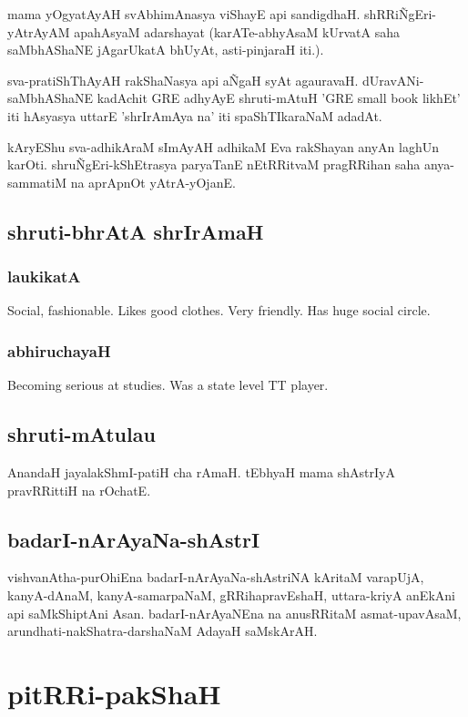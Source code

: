 \documentclass[oneside, article]{memoir}
\begin{document}
mama yOgyatAyAH svAbhimAnasya viShayE api sandigdhaH. shRRi\~NgEri-yAtrAyAM  apahAsyaM adarshayat (karATe-abhyAsaM kUrvatA saha saMbhAShaNE jAgarUkatA bhUyAt, asti-pinjaraH iti.).

sva-pratiShThAyAH rakShaNasya api a\~NgaH syAt agauravaH. dUravANi-saMbhAShaNE kadAchit GRE adhyAyE shruti-mAtuH 'GRE small book likhEt' iti hAsyasya uttarE 'shrIrAmAya na' iti spaShTIkaraNaM adadAt.

kAryEShu sva-adhikAraM sImAyAH adhikaM Eva rakShayan anyAn laghUn karOti. shru\~NgEri-kShEtrasya paryaTanE nEtRRitvaM pragRRihan saha anya-sammatiM na aprApnOt yAtrA-yOjanE.

\chapter{shruti-bhrAtA shrIrAmaH}
\section{laukikatA}
Social, fashionable. Likes good clothes. Very friendly. Has huge social circle.

\section{abhiruchayaH}
Becoming serious at studies. Was a state level TT player.

\chapter{shruti-mAtulau}
AnandaH jayalakShmI-patiH cha rAmaH. tEbhyaH mama shAstrIyA pravRRittiH na rOchatE.

\chapter{badarI-nArAyaNa-shAstrI}
vishvanAtha-purOhiEna badarI-nArAyaNa-shAstriNA kAritaM varapUjA, kanyA-dAnaM, kanyA-samarpaNaM, gRRihapravEshaH, uttara-kriyA anEkAni api saMkShiptAni Asan. badarI-nArAyaNEna na anusRRitaM asmat-upavAsaM, arundhati-nakShatra-darshaNaM AdayaH saMskArAH.

\part{pitRRi-pakShaH}
\end{document}

